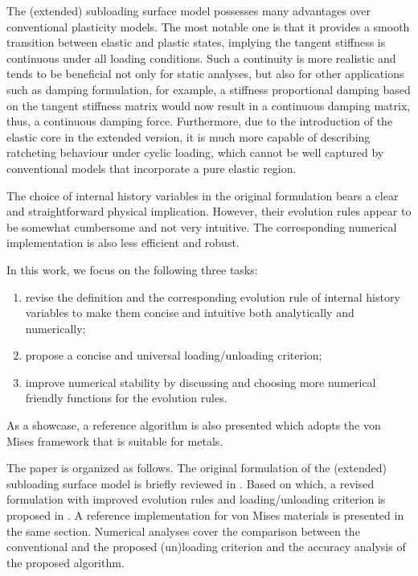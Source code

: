 The (extended) subloading surface model possesses many advantages over conventional plasticity models.
The most notable one is that it provides a smooth transition between elastic and plastic states, implying the tangent stiffness is continuous under all loading conditions.
Such a continuity is more realistic and tends to be beneficial not only for static analyses, but also for other applications such as damping formulation, for example, a stiffness proportional damping based on the tangent stiffness matrix would now result in a continuous damping matrix, thus, a continuous damping force.
Furthermore, due to the introduction of the elastic core in the extended version, it is much more capable of describing ratcheting behaviour under cyclic loading, which cannot be well captured by conventional models that incorporate a pure elastic region.

The choice of internal history variables in the original formulation bears a clear and straightforward physical implication.
However, their evolution rules appear to be somewhat cumbersome and not very intuitive.
The corresponding numerical implementation \citep[see, e.g.,][]{Fincato2017,Anjiki2019,Anjiki2021} is also less efficient and robust.

In this work, we focus on the following three tasks:
\begin{enumerate}
    \item revise the definition and the corresponding evolution rule of internal history variables to make them concise and intuitive both analytically and numerically;
    \item propose a concise and universal loading/unloading criterion;
    \item improve numerical stability by discussing and choosing more numerical friendly functions for the evolution rules.
\end{enumerate}
As a showcase, a reference algorithm is also presented which adopts the von Mises framework that is suitable for metals.

The paper is organized as follows.
The original formulation of the (extended) subloading surface model is briefly reviewed in .
Based on which, a revised formulation with improved evolution rules and loading/unloading criterion is proposed in .
A reference implementation for von Mises materials is presented in the same section.
Numerical analyses cover the comparison between the conventional and the proposed (un)loading criterion and the accuracy analysis of the proposed algorithm.